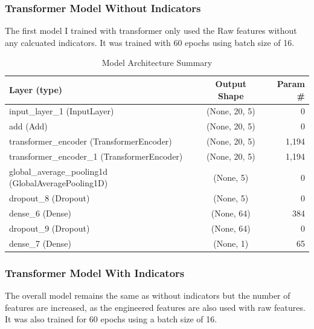 \subsubsection{Transformer Model Without Indicators}

The first model I trained with transformer only used the Raw features without any calcuated indicators. It was trained with 60 epochs using batch size of 16.

\begin{table}[h]
\centering
\caption{Model Architecture Summary}
\label{tab:model_summary}
\begin{tabular}{|l|c|r|}
\hline
\textbf{Layer (type)} & \textbf{Output Shape} & \textbf{Param \#} \\
\hline
input\_layer\_1 (InputLayer) & (None, 20, 5) & 0 \\
\hline
add (Add) & (None, 20, 5) & 0 \\
\hline
transformer\_encoder (TransformerEncoder) & (None, 20, 5) & 1,194 \\
\hline
transformer\_encoder\_1 (TransformerEncoder) & (None, 20, 5) & 1,194 \\
\hline
global\_average\_pooling1d (GlobalAveragePooling1D) & (None, 5) & 0 \\
\hline
dropout\_8 (Dropout) & (None, 5) & 0 \\
\hline
dense\_6 (Dense) & (None, 64) & 384 \\
\hline
dropout\_9 (Dropout) & (None, 64) & 0 \\
\hline
dense\_7 (Dense) & (None, 1) & 65 \\
\hline
\end{tabular}
\end{table}

\subsubsection {Transformer Model With Indicators}

The overall model remains the same as without indicators but the number of features are increased, as the engineered features are also used with raw features. It was also trained for 60 epochs using a batch size of 16.

